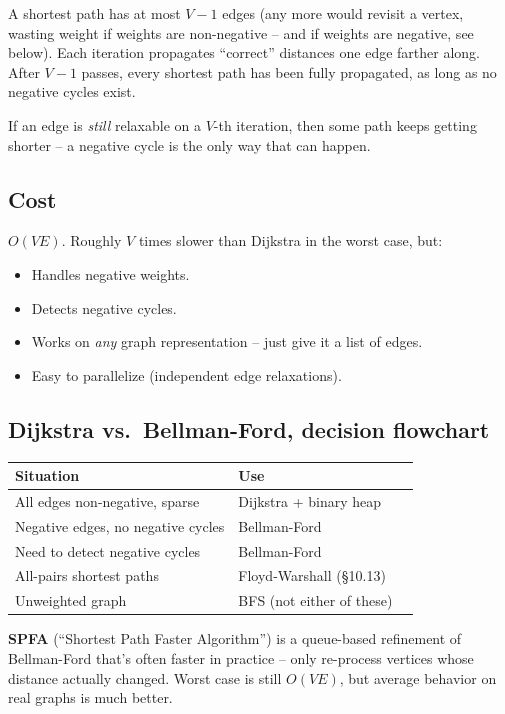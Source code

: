 \documentclass[11pt]{article}
\begin{document}
A shortest path has at most $V-1$ edges (any more would revisit a vertex, wasting weight if weights are non-negative -- and if weights are negative, see below). Each iteration propagates ``correct'' distances one edge farther along. After $V-1$ passes, every shortest path has been fully propagated, as long as no negative cycles exist.

If an edge is \emph{still} relaxable on a $V$-th iteration, then some path keeps getting shorter -- a negative cycle is the only way that can happen.

\subsection*{Cost}

$O(VE)$. Roughly $V$ times slower than Dijkstra in the worst case, but:

\begin{itemize}[leftmargin=*]
    \item Handles negative weights.
    \item Detects negative cycles.
    \item Works on \emph{any} graph representation -- just give it a list of edges.
    \item Easy to parallelize (independent edge relaxations).
\end{itemize}

\subsection*{Dijkstra vs.\ Bellman-Ford, decision flowchart}

\begin{center}
\begin{tabular}{lll}
\hline
Situation & Use \\
\hline
All edges non-negative, sparse & Dijkstra + binary heap \\
Negative edges, no negative cycles & Bellman-Ford \\
Need to detect negative cycles & Bellman-Ford \\
All-pairs shortest paths & Floyd-Warshall (§10.13) \\
Unweighted graph & BFS (not either of these) \\
\hline
\end{tabular}
\end{center}

\begin{notebox}
\textbf{SPFA} (``Shortest Path Faster Algorithm'') is a queue-based refinement of Bellman-Ford that's often faster in practice -- only re-process vertices whose distance actually changed. Worst case is still $O(VE)$, but average behavior on real graphs is much better.
\end{notebox}
\end{document}
